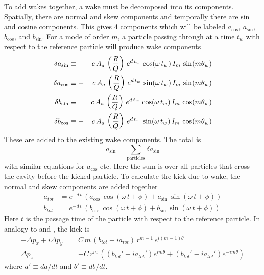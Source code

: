 To add wakes together, a wake must be decomposed into its components.  Spatially, there are normal
and skew components and temporally there are sin and cosine components. This gives 4 components
which will be labeled $a_{\cos}$, $a_{\sin}$, $b_{\cos}$, and $b_{\sin}$. For a mode of order $m$, a
particle passing through at a time $t_w$ with respect to the reference particle will produce wake
components
\begin{alignat}{2}
  \delta a_{\sin} &\equiv  &c \, A_a \, \left( \frac{R}{Q} \right) \,
    e^{d \, t_w} \, \cos (\omega \, t_w) \, I_m \, \sin(m \theta_w) 
    \nonumber \\
  \delta a_{\cos} &\equiv -&c \, A_a \, \left( \frac{R}{Q} \right) \,
    e^{d \, t_w} \, \sin (\omega \, t_w) \, I_m \, \sin(m \theta_w) 
    \label{ac2rq} 
    \\
  \delta b_{\sin} &\equiv  &c \, A_a \, \left( \frac{R}{Q} \right) \,
    e^{d \, t_w} \, \cos (\omega \, t_w) \, I_m \, \cos(m \theta_w) 
    \nonumber \\
  \delta b_{\cos} &\equiv -&c \, A_a \, \left( \frac{R}{Q} \right) \,
    e^{d \, t_w} \, \sin (\omega \, t_w) \, I_m \, \cos(m \theta_w) 
    \nonumber
\end{alignat}
These are added to the existing wake components. The total is
\begin{equation}
  a_{\sin} = \sum_{\text{particles}} \delta a_{\sin}
\end{equation}
with similar equations for $a_{\cos}$ etc. Here the sum is over all particles that cross the
cavity before the kicked particle. To calculate the kick due to wake, the normal and skew components
are added together
\begin{align}
  a_{tot} &= e^{-d \, t} \, \left( 
    a_{\cos} \, \cos (\omega \, t + \phi) + a_{\sin} \, \sin (\omega \, t + \phi) \right) 
    \label{akz2q} \\
  b_{tot} &= e^{-d \, t} \, \left(
    b_{\cos} \, \cos (\omega \, t + \phi) + b_{\sin} \, \sin (\omega \, t + \phi) \right) \nonumber 
\end{align}
Here $t$ is the passage time of the particle with respect to the reference particle. In analogy to
 and , the kick is
\begin{align}
  -\Delta p_x + i\Delta p_y &= C \, 
    m \, (b_{tot} + i a_{tot}) \, r^{m-1} \, e^{i (m-1) \theta} 
    \label{ppcmbar} \\
  \Delta p_z &= -C \, r^m \, \left( 
    (b_{tot}' + i a_{tot}') e^{i m\theta} + (b_{tot}' - i a_{tot}') e^{-i m\theta} \right)
\end{align}
where $a' \equiv da/dt$ and $b' \equiv db/dt$.

